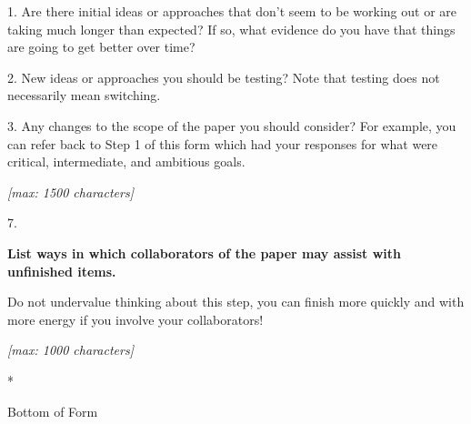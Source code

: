 \documentclass[]{article}
\begin{document}
1. Are there initial ideas or approaches that don't seem to be working
out or are taking much longer than expected? If so, what evidence do you
have that things are going to get better over time?

2. New ideas or approaches you should be testing? Note that testing does
not necessarily mean switching.

3. Any changes to the scope of the paper you should consider? For
example, you can refer back to Step 1 of this form which had your
responses for what were critical, intermediate, and ambitious goals.

\emph{{[}max: 1500 characters{]}}

7.

\textbf{List ways in which collaborators of the paper may assist with
unfinished items.}

Do not undervalue thinking about this step, you can finish more quickly
and with more energy if you involve your collaborators!

\emph{{[}max: 1000 characters{]}}

*

Bottom of Form
\end{document}
